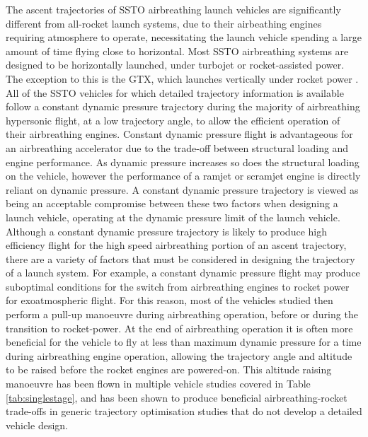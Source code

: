 The ascent trajectories of SSTO airbreathing launch vehicles are significantly different from all-rocket launch systems, due to their airbeathing engines requiring atmosphere to operate, necessitating the launch vehicle spending a large amount of time flying close to horizontal.
Most SSTO airbreathing systems are designed to be horizontally launched, under turbojet or rocket-assisted power\cite{NASP,WCC,Powell1991,Lu1993,Aberleen,Bradford2000, HyperX,Young2006}. The exception to this is the GTX, which launches vertically under rocket power\cite{Roche2000,Trefny1999} . 
All of the SSTO vehicles for which detailed trajectory information is available follow a constant dynamic pressure trajectory during the majority of airbreathing hypersonic flight, at a low trajectory angle, to allow the efficient operation of their airbreathing engines\cite{NASP,WCC,Powell1991,Lu1993,Aberleen,Bradford2000, HyperX,Young2006}. 
Constant dynamic pressure flight is advantageous for an airbreathing accelerator due to the trade-off between structural loading and engine performance\cite{Olds1998}. As dynamic pressure increases so does the structural loading on the vehicle, however the performance of a ramjet or scramjet engine is directly reliant on dynamic pressure\cite{Olds1998}. A constant dynamic pressure trajectory is viewed as being an acceptable compromise between these two factors when designing a launch vehicle, operating at the dynamic pressure limit of the launch vehicle. 
Although a constant dynamic pressure trajectory is likely to produce high efficiency flight for the high speed airbreathing portion of an ascent trajectory, there are a variety of factors that must be considered in designing the trajectory of a launch system. 
For example, a constant dynamic pressure flight may produce suboptimal conditions for the switch from airbreathing engines to rocket power for exoatmospheric flight. For this reason, most of the vehicles studied then perform a pull-up manoeuvre during airbreathing operation, before or during the transition to rocket-power. 
At the end of airbreathing operation it is often more beneficial for the vehicle to fly at less than maximum dynamic pressure for a time during airbreathing engine operation, allowing the trajectory angle and altitude to be raised before the rocket engines are powered-on. 
This altitude raising manoeuvre has been  flown in multiple vehicle studies covered in Table \ref{tab:singlestage}\cite{Argus,Powell1991,Trefny1999,Roche2000,Pescetelli2012,Young2006,Bradford2000,Hyperion}, and has been shown to produce beneficial airbreathing-rocket trade-offs in generic trajectory optimisation studies that do not develop a detailed vehicle design\cite{Pescetelli2012,Mooij,Lu1993}.
